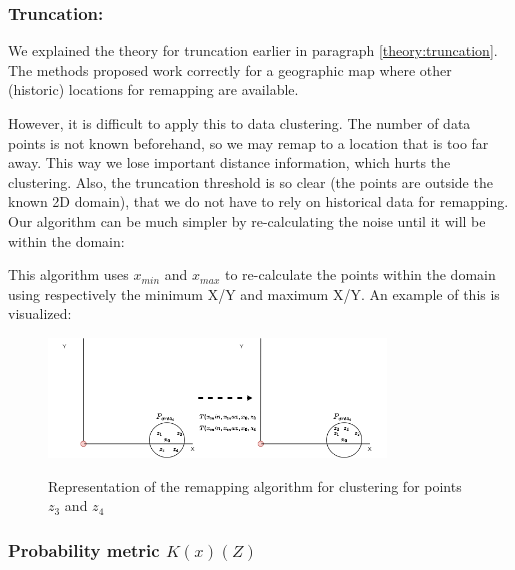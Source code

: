 \subsubsection{Truncation: }
We explained the theory for truncation earlier in paragraph \ref{theory:truncation}.
The methods proposed work correctly for a geographic map where other (historic) locations for remapping are available.

However, it is difficult to apply this to data clustering.
The number of data points is not known beforehand, so we may remap to a location that is too far away.
This way we lose important distance information, which hurts the clustering.
Also, the truncation threshold is so clear (the points are outside the known 2D domain), that we do not have to rely on historical data for remapping.
Our algorithm can be much simpler by re-calculating the noise until it will be within the domain:

This algorithm uses $x_{min}$ and $x_{max}$ to re-calculate the points within the domain using respectively the minimum X/Y and maximum X/Y.
An example of this is visualized:
\begin{figure}[h]
  \includegraphics[width=0.8\textwidth]{Method/images/truncation-rq1.png}
  \label{fig:truncation}
  \centering
  \caption{Representation of the remapping algorithm for clustering for points $z_3$ and $z_4$ }
\end{figure}

\subsubsection{Probability metric $K(x)(Z)$}

